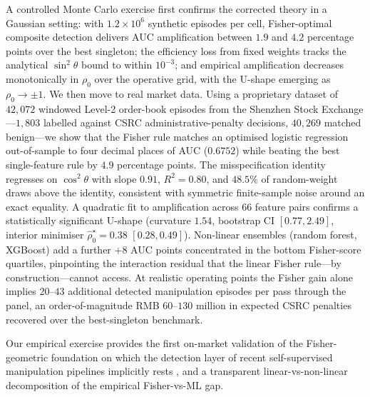 \documentclass[11pt,a4paper]{article}
\theoremstyle{definition}
\theoremstyle{remark}
\newcommand{\1}{\mathbf{1}}
\begin{document}
A controlled Monte Carlo exercise first confirms the corrected theory in a Gaussian setting: with $1.2\times 10^{6}$ synthetic episodes per cell, Fisher-optimal composite detection delivers AUC amplification between $1.9$ and $4.2$ percentage points over the best singleton; the efficiency loss from fixed weights tracks the analytical $\sin^2\theta$ bound to within $10^{-3}$; and empirical amplification decreases monotonically in $\rho_0$ over the operative grid, with the U-shape emerging as $\rho_0\to\pm 1$. We then move to real market data. Using a proprietary dataset of $42{,}072$ windowed Level-2 order-book episodes from the Shenzhen Stock Exchange---$1{,}803$ labelled against CSRC administrative-penalty decisions, $40{,}269$ matched benign---we show that the Fisher rule matches an optimised logistic regression out-of-sample to four decimal places of AUC ($0.6752$) while beating the best single-feature rule by $4.9$ percentage points. The misspecification identity regresses on $\cos^2\theta$ with slope $0.91$, $R^2 = 0.80$, and $48.5\%$ of random-weight draws above the identity, consistent with symmetric finite-sample noise around an exact equality. A quadratic fit to amplification across $66$ feature pairs confirms a statistically significant U-shape (curvature $1.54$, bootstrap CI $[0.77, 2.49]$, interior minimiser $\widehat\rho_0^\star=0.38$ $[0.28, 0.49]$). Non-linear ensembles (random forest, XGBoost) add a further $+8$ AUC points concentrated in the bottom Fisher-score quartiles, pinpointing the interaction residual that the linear Fisher rule---by construction---cannot access. At realistic operating points the Fisher gain alone implies $20$--$43$ additional detected manipulation episodes per pass through the panel, an order-of-magnitude RMB $60$--$130$ million in expected CSRC penalties recovered over the best-singleton benchmark.

Our empirical exercise provides the first on-market validation of the Fisher-geometric foundation on which the detection layer of recent self-supervised manipulation pipelines implicitly rests \citep{dai2026sdfmm,james2023machine}, and a transparent linear-vs-non-linear decomposition of the empirical Fisher-vs-ML gap.
\end{document}
